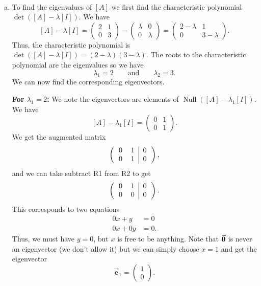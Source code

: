 \documentclass[12pt]{article} %
\newcommand{\Null}{\operatorname{Null}}
\newcommand{\evec}{\vec{\boldsymbol{e}}}
\begin{document}
\begin{solution}~
\begin{enumerate}[(a)]
    \item To find the eigenvalues of $[A]$ we first find the characteristic polynomial $\det([A]-\lambda [I])$. We have
    \[
        [A]-\lambda [I] = \begin{pmatrix} 2 & 1 \\ 0 & 3 \end{pmatrix} - \begin{pmatrix} \lambda & 0 \\ 0 & \lambda \end{pmatrix} = \begin{pmatrix} 2-\lambda & 1 \\ 0  & 3 - \lambda \end{pmatrix}.
    \]
    Thus, the characteristic polynomial is $\det([A]-\lambda [I]) = (2-\lambda)(3-\lambda)$.  The roots to the characteristic polynomial are the eigenvalues so we have
    \[
        \lambda_1 = 2 \qquad \textrm{and} \qquad \lambda_2 = 3.
    \]
    We can now find the corresponding eigenvectors.

    \noindent\textbf{For $\lambda_1 = 2$:} We note the eigenvectors are elements of $\Null([A]-\lambda_1[I])$.  We have
    \[
    [A]-\lambda_1 [I] = \begin{pmatrix} 0 & 1 \\ 0 & 1 \end{pmatrix}.
    \]
    We get the augmented matrix
    \[
        \left(\begin{tabular}{cc|c} 0 & 1 & 0 \\ 0 & 1 & 0 \end{tabular}\right),
    \]
    and we can take subtract R1 from R2 to get
    \[
        \left(\begin{tabular}{cc|c} 0 & 1 & 0 \\ 0 & 0 & 0 \end{tabular}\right).
    \]
    This corresponds to two equations
    \begin{align*}
        0x + y &=0\\
        0x + 0y &=0.
    \end{align*}
    Thus, we must have $y=0$, but $x$ is free to be anything.  Note that $\boldsymbol{\vec{0}}$ is never an eigenvector (we don't allow it) but we can simply choose $x=1$ and get the eigenvector
    \[
    \evec_1 = \begin{pmatrix} 1 \\ 0 \end{pmatrix}.
    \]


\end{enumerate}
\end{solution}
\end{document}
